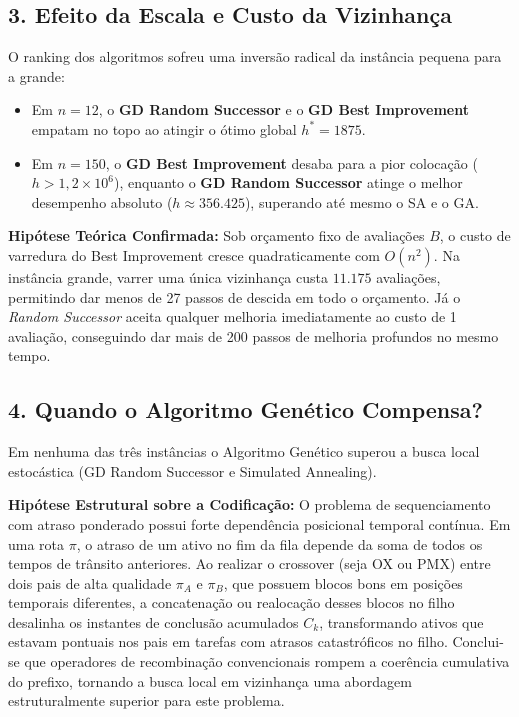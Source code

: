 \documentclass[11pt,a4paper]{article}
\begin{document}
\subsection{3. Efeito da Escala e Custo da Vizinhança}
O ranking dos algoritmos sofreu uma inversão radical da instância pequena para a grande:
\begin{itemize}
    \item Em $n=12$, o \textbf{GD Random Successor} e o \textbf{GD Best Improvement} empatam no topo ao atingir o ótimo global $h^*=1875$.
    \item Em $n=150$, o \textbf{GD Best Improvement} desaba para a pior colocação ($h > 1{,}2 \times 10^6$), enquanto o \textbf{GD Random Successor} atinge o melhor desempenho absoluto ($h \approx 356.425$), superando até mesmo o SA e o GA.
\end{itemize}
\textbf{Hipótese Teórica Confirmada:} Sob orçamento fixo de avaliações $B$, o custo de varredura do Best Improvement cresce quadraticamente com $O(n^2)$. Na instância grande, varrer uma única vizinhança custa $11.175$ avaliações, permitindo dar menos de 27 passos de descida em todo o orçamento. Já o \emph{Random Successor} aceita qualquer melhoria imediatamente ao custo de 1 avaliação, conseguindo dar mais de 200 passos de melhoria profundos no mesmo tempo.

\subsection{4. Quando o Algoritmo Genético Compensa?}
Em nenhuma das três instâncias o Algoritmo Genético superou a busca local estocástica (GD Random Successor e Simulated Annealing). 

\textbf{Hipótese Estrutural sobre a Codificação:} O problema de sequenciamento com atraso ponderado possui forte dependência posicional temporal contínua. Em uma rota $\pi$, o atraso de um ativo no fim da fila depende da soma de todos os tempos de trânsito anteriores. Ao realizar o crossover (seja OX ou PMX) entre dois pais de alta qualidade $\pi_A$ e $\pi_B$, que possuem blocos bons em posições temporais diferentes, a concatenação ou realocação desses blocos no filho desalinha os instantes de conclusão acumulados $C_k$, transformando ativos que estavam pontuais nos pais em tarefas com atrasos catastróficos no filho. Conclui-se que operadores de recombinação convencionais rompem a coerência cumulativa do prefixo, tornando a busca local em vizinhança uma abordagem estruturalmente superior para este problema.
\end{document}
